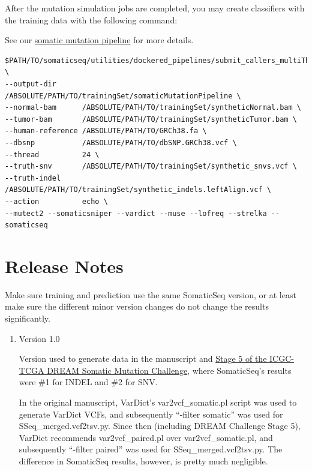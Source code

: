 \documentclass[10pt,letterpaper]{article}
\begin{document}
\begin{sloppypar}
After the mutation simulation jobs are completed, you may create classifiers with the training data with the following command:

See our \href{https://github.com/bioinform/somaticseq/blob/master/utilities/dockered_pipelines}{somatic mutation pipeline} for more details.

\begin{lstlisting}
$PATH/TO/somaticseq/utilities/dockered_pipelines/submit_callers_multiThreads.sh \
--output-dir      /ABSOLUTE/PATH/TO/trainingSet/somaticMutationPipeline \
--normal-bam      /ABSOLUTE/PATH/TO/trainingSet/syntheticNormal.bam \
--tumor-bam       /ABSOLUTE/PATH/TO/trainingSet/syntheticTumor.bam \
--human-reference /ABSOLUTE/PATH/TO/GRCh38.fa \
--dbsnp           /ABSOLUTE/PATH/TO/dbSNP.GRCh38.vcf \
--thread          24 \
--truth-snv       /ABSOLUTE/PATH/TO/trainingSet/synthetic_snvs.vcf \
--truth-indel     /ABSOLUTE/PATH/TO/trainingSet/synthetic_indels.leftAlign.vcf \
--action          echo \
--mutect2 --somaticsniper --vardict --muse --lofreq --strelka --somaticseq
\end{lstlisting}





\section{Release Notes}

Make sure training and prediction use the same SomaticSeq version, or at least make sure the different minor version changes do not change the results significantly. 


\begin{enumerate}


	\item Version 1.0
	
		Version used to generate data in the manuscript and \href{https://www.synapse.org/#!Synapse:syn312572/wiki/72943}{Stage 5 of the ICGC-TCGA DREAM Somatic Mutation Challenge}, where SomaticSeq's results were \#1 for INDEL and \#2 for SNV. 
		
		In the original manuscript, VarDict's var2vcf\_somatic.pl script was used to generate VarDict VCFs, and subsequently ``-filter somatic'' was used for SSeq\_merged.vcf2tsv.py. Since then (including DREAM Challenge Stage 5), VarDict recommends var2vcf\_paired.pl over var2vcf\_somatic.pl, and subsequently ``-filter paired'' was used for SSeq\_merged.vcf2tsv.py. The difference in SomaticSeq results, however, is pretty much negligible. 
	

\end{enumerate}
\end{sloppypar}
\end{document}

